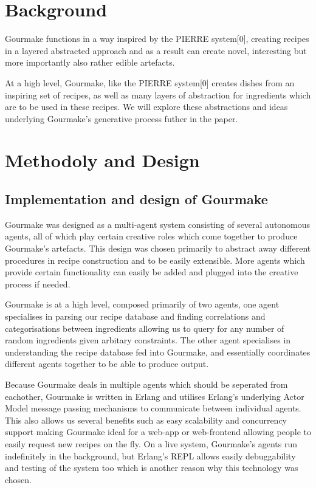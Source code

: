 \documentclass[9pt,titlepage,a4paper]{extarticle}
\begin{document}
\section{Background}
    Gourmake functions in a way inspired by the PIERRE system[0], creating recipes in a layered
    abstracted approach and as a result can create novel, interesting but more importantly also
    rather edible artefacts. 

    At a high level, Gourmake, like the PIERRE system[0] creates dishes from an inspiring set of recipes,
    as well as many layers of abstraction for ingredients which are to be used in these recipes. We will
    explore these abstractions and ideas underlying Gourmake's generative process futher in the paper.

\section{Methodoly and Design}

\subsection{Implementation and design of Gourmake}
    Gourmake was designed as a multi-agent system consisting of several autonomous agents, all of which
    play certain creative roles which come together to produce Gourmake's artefacts. This design was chosen
    primarily to abstract away different procedures in recipe construction and to be easily extensible.
    More agents which provide certain functionality can easily be added and plugged into the creative process
    if needed.

    Gourmake is at a high level, composed primarily of two agents, one agent specialises in parsing our
    recipe database and finding correlations and categorisations between ingredients allowing us to query
    for any number of random ingredients given arbitary constraints. The other agent specialises in
    understanding the recipe database fed into Gourmake, and essentially coordinates different agents together
    to be able to produce output.

    Because Gourmake deals in multiple agents which should be seperated from eachother, Gourmake is written
    in Erlang and utilises Erlang's underlying Actor Model message passing mechanisms to communicate between
    individual agents. This also allows us several benefits such as easy scalability and concurrency support
    making Gourmake ideal for a web-app or web-frontend allowing people to easily request new recipes on the fly.
    On a live system, Gourmake's agents run indefinitely in the background, but Erlang's REPL allows easily
    debuggability and testing of the system too which is another reason why this technology was chosen.
\end{document}
